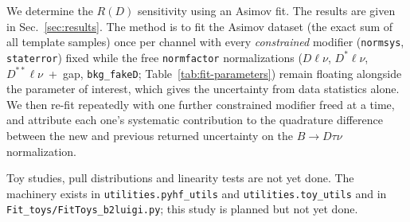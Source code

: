 We determine the $R(D)$ sensitivity using an Asimov fit.
The results are given in Sec.~\ref{sec:results}. 
The method is to fit the Asimov dataset (the exact
sum of all template samples) once per channel with every \emph{constrained}
modifier (\texttt{normsys}, \texttt{staterror}) fixed while the free
\texttt{normfactor} normalizations ($D\ell\nu$, $D^{*}\ell\nu$,
$D^{**}\ell\nu$~+~gap, \texttt{bkg\_fakeD}; Table~\ref{tab:fit-parameters})
remain floating alongside the parameter of interest, which gives the
uncertainty from data statistics alone. We then re-fit repeatedly with one further
constrained modifier freed at a time, and attribute each one's systematic
contribution to the quadrature difference between the new and previous
returned uncertainty on the $B\to D\tau\nu$ normalization.


Toy studies, pull distributions and linearity tests are not yet done.
The machinery exists in \texttt{utilities.pyhf\_utils} and
\texttt{utilities.toy\_utils} and in \texttt{Fit\_toys/FitToys\_b2luigi.py};
this study is planned but not yet done.

